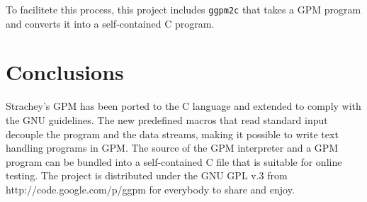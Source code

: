 \documentclass[letterpaper,10pt]{article}
\begin{document}
To facilitete this process, this project includes \texttt{ggpm2c} that
takes a GPM program and converts it into a self-contained C program.

\section{Conclusions}
Strachey's GPM has been ported to the C language and extended to comply with the GNU
guidelines. The new predefined macros that read standard input decouple
the program and the data streams, making it possible to write text handling programs
in GPM. The source of the GPM interpreter and a GPM program can be bundled into
a self-contained C file that is suitable for online testing.
The project is distributed under the GNU GPL v.3 from http://code.google.com/p/ggpm
for everybody to share and enjoy.



\end{document}
